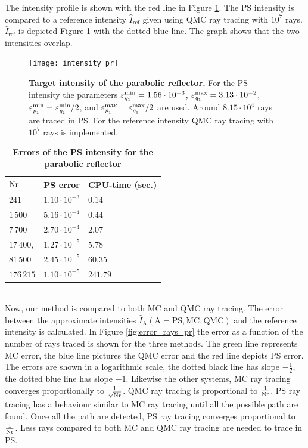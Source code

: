 The intensity profile is shown with the red line in Figure \ref{fig:intensity_pr}. The PS intensity is compared to a reference intensity $\hat{I}_{\textrm{ref}}$ given using QMC ray tracing with $10^7$ rays. $\hat{I}_{\textrm{ref}}$ is depicted Figure \ref{fig:intensity_pr} with the dotted blue line. The graph shows that the two intensities overlap.
 \begin{figure}[h!]
  \center
  \texttt{[image: intensity\_pr]}
  \caption{\textbf{Target intensity of the parabolic reflector.} For the PS intensity the parameters $\varepsilon_{\textit{q}_1}^{\textrm{min}}=1.56\cdot 10^{-3}$, $\varepsilon_{\textit{q}_1}^{\textrm{max}}=3.13\cdot 10^{-2}$, $\varepsilon_{\textit{p}_1}^{\textrm{min}}=\varepsilon_{\textit{q}_1}^{\textrm{min}}/2$, and $\varepsilon_{\textit{p}_1}^{\textrm{max}}=\varepsilon_{\textit{q}_1}^{\textrm{max}}/2$ are used. Around $8.15 \cdot 10^{4}$ rays are traced in PS. For the reference intensity QMC ray tracing with $10^7$ rays is implemented.}
  \label{fig:intensity_pr}
\end{figure}
\begin{table}[ht] \label{tab:table_tir_triangulation}
\centering
\caption{\bf Errors of the PS intensity for the parabolic reflector}
\begin{tabular}{lll}
 \hline   $\textrm{Nr}$ & PS error & CPU-time (sec.) \\
  \hline 
 $241$        & $1.10\cdot10^{-3}$ & $0.14$\\
 $1\,500$     & $5.16\cdot 10^{-4}$ & $0.44$ \\
 $7\,700$     & $2.70\cdot 10^{-4}$ & $2.07$\\
 $17\,400,$   & $1.27\cdot 10^{-5}$ & $5.78$\\
 $81\,500$    & $2.45\cdot 10^{-5}$ & $60.35$\\
 $176\,215$   & $1.10\cdot 10^{-5}$ & $241.79$\\
 \hline
 \end{tabular}
 \label{tab:ps_error_triangulation}
 \end{table}
\\ \indent 
Now, our method is compared to both MC and QMC ray tracing. 
The error between the approximate intensities $\hat{I}_{\textrm{A}}(\textrm{A}=\textrm{PS}, \textrm{MC}, \textrm{QMC})$ and the reference intensity is calculated. In Figure \ref{fig:error_rays_pr} the error as a function of the number of rays traced is shown for the three methods.
The green line represents MC error, the blue line pictures the QMC error and the red line depicts PS error. The errors are shown in a logarithmic scale, the dotted black line has slope $-\frac{1}{2}$, the dotted blue line has slope $-1$. Likewise the other systems, MC ray tracing converges proportionally to $\frac{1}{\sqrt{\textrm{Nr}}}$. QMC ray tracing is proportional to $\frac{1}{\textrm{Nr}}$. PS ray tracing has a behaviour similar to MC ray tracing until all the possible path are found. Once all the path are detected, PS ray tracing converges proportional to $\frac{1}{\textrm{Nr}}$. Less rays compared to both MC and QMC ray tracing are needed to trace in PS.
